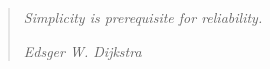\documentclass[../Main/thesis.tex]{subfiles}
\begin{document}
\chapter*{}
\null\vfill
\begin{quotation}
\centering
\em
Simplicity is prerequisite for reliability.

\em
\medskip
\raggedleft
Edsger W. Dijkstra
\end{quotation}
\vfill\vfill
\end{document}
